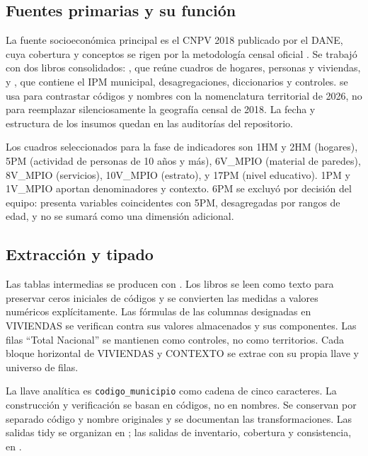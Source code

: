 \subsection{Fuentes primarias y su función}

La fuente socioeconómica principal es el CNPV 2018 publicado por el DANE, cuya cobertura y conceptos se rigen por la metodología censal oficial \citep{dane2021cnpv}. Se trabajó con dos libros consolidados: , que reúne cuadros de hogares, personas y viviendas, y , que contiene el IPM municipal, desagregaciones, diccionarios y controles.  se usa para contrastar códigos y nombres con la nomenclatura territorial de 2026, no para reemplazar silenciosamente la geografía censal de 2018. La fecha y estructura de los insumos quedan en las auditorías del repositorio.

Los cuadros seleccionados para la fase de indicadores son 1HM y 2HM (hogares), 5PM (actividad de personas de 10 años y más), 6V\_MPIO (material de paredes), 8V\_MPIO (servicios), 10V\_MPIO (estrato), y 17PM (nivel educativo). 1PM y 1V\_MPIO aportan denominadores y contexto. 6PM se excluyó por decisión del equipo: presenta variables coincidentes con 5PM, desagregadas por rangos de edad, y no se sumará como una dimensión adicional.

\subsection{Extracción y tipado}

Las tablas intermedias se producen con . Los libros se leen como texto para preservar ceros iniciales de códigos y se convierten las medidas a valores numéricos explícitamente. Las fórmulas de las columnas designadas en VIVIENDAS se verifican contra sus valores almacenados y sus componentes. Las filas \enquote{Total Nacional} se mantienen como controles, no como territorios. Cada bloque horizontal de VIVIENDAS y CONTEXTO se extrae con su propia llave y universo de filas.

La llave analítica es \texttt{codigo\_municipio} como cadena de cinco caracteres. La construcción y verificación se basan en códigos, no en nombres. Se conservan por separado código y nombre originales y se documentan las transformaciones. Las salidas tidy se organizan en ; las salidas de inventario, cobertura y consistencia, en .


